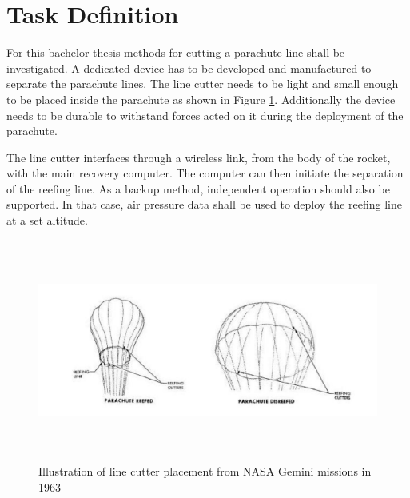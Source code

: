 \section{Task Definition}

For this bachelor thesis methods for cutting a parachute line shall be investigated. A dedicated device has to be developed and manufactured to separate the parachute lines. The line cutter needs to be light and small enough to be placed inside the parachute as shown in Figure \ref{fig:cutter-placement}. Additionally the device needs to be durable to withstand forces acted on it during the deployment of the parachute.  

The line cutter interfaces through a wireless link, from the body of the rocket, with the main recovery computer. The computer can then initiate the separation of the reefing line. As a backup method, independent operation should also be supported. In that case, air pressure data shall be used to deploy the reefing line at a set altitude.

\begin{figure}[h!]
	\centering
	\includegraphics[height=7.3cm]{images/parachute_placement.png}
	\caption{Illustration of line cutter placement from NASA Gemini missions in 1963}
	\label{fig:cutter-placement}
\end{figure}